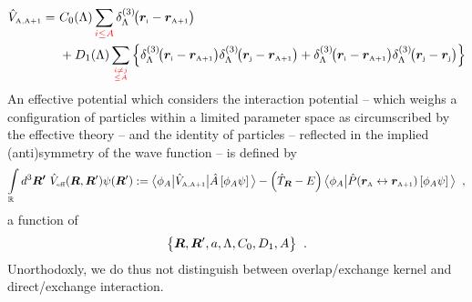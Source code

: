 \documentclass[aps,prd,onecolumn
,tightenlines,letterpaper,
notitlepage,11pt,
nofootinbib]{revtex4-1}
\begin{document}
\begin{align}
\hat{V}_\text{\tiny A,A+1}=&~C_0(\Lambda)\sum\limits_{\red{i\leq A}}\ddrei{\vsp{i}-\vsp{A+1}}\la{eq.v2}\\
&~+D_1(\Lambda)\sum\limits_{\red{i\neq j\atop \leq A}}\left\lbrace\ddrei{\vsp{i}-\vsp{A+1}}\ddrei{\vsp{j}-\vsp{A+1}}+\ddrei{\vsp{i}-\vsp{A+1}}\ddrei{\vsp{j}-\vsp{j}}\right\rbrace\la{eq.v3}
\end{align}
An effective potential which considers the
interaction potential -- which weighs a configuration of particles within a limited
parameter space as circumscribed by the effective theory -- and the
identity of particles -- reflected in the implied (anti)symmetry of the
wave function -- is defined by
\begin{gather}
\int\limits_{\mathbb{R}}d^3\boldsymbol{R'}~\hat{V}_\text{\tiny eff}(\boldsymbol{R},\boldsymbol{R}')\psi(\boldsymbol{R}')
:=
\big\langle\phi_A\big\vert\hat{V}_\text{\tiny A,A+1}\big\vert\hat{A}\left[\phi_A\psi\right]\big\rangle-\left(\hat{T}_{\boldsymbol{R}}-E\right)\big\langle\phi_A\big\vert\hat{P}(\boldsymbol{r}_\text{\tiny A}\leftrightarrow\boldsymbol{r}_\text{\tiny A+1})\left[\phi_A\psi\right]\big\rangle\;\;,
\end{gather}
a function of
$$ \big\lbrace\boldsymbol{R},\boldsymbol{R}',a,\Lambda,C_0,D_1,A\big\rbrace\;\;. $$
Unorthodoxly, we do thus not distinguish between overlap/exchange kernel and direct/exchange interaction.
\end{document}

